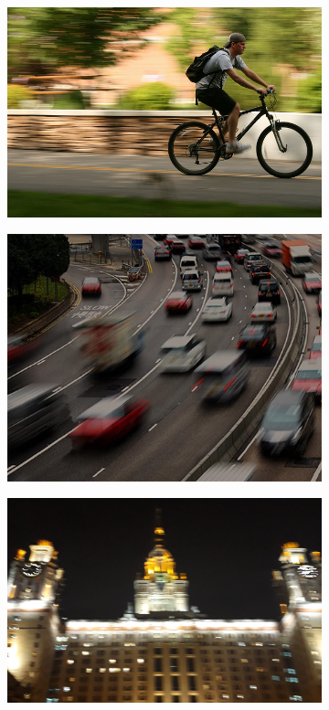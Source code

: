 \begin{figure}[h!]
  \centering
  \begin{subfigure}[b]{0.4\linewidth}
    \includegraphics[width=\linewidth]{pics/linear_motion_blur/bicycle.jpg}
  \end{subfigure}
  \begin{subfigure}[b]{0.4\linewidth}
    \includegraphics[width=\linewidth]{pics/linear_motion_blur/traffic.jpg}
  \end{subfigure}
  \begin{subfigure}[b]{0.5\linewidth}
    \includegraphics[width=\linewidth]{pics/linear_motion_blur/mb0.jpg}

\end{subfigure}
\end{figure}
